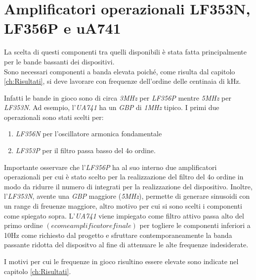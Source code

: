 \documentclass[titlepage]{report}
\begin{document}
	
\section{Amplificatori operazionali LF353N, LF356P e uA741}
\label{sec:OpAmp}
	La scelta di questi componenti tra quelli disponibili è stata fatta principalmente per le bande bassanti dei dispositivi.
	\\ Sono necessari componenti a banda elevata poiché, come risulta dal capitolo \ref{ch:Risultati}, si deve lavorare con frequenze dell'ordine delle centinaia di kHz.
	
	 \noindent Infatti le bande in gioco sono di circa \textit{3MHz} per \textit{LF356P} mentre \textit{5MHz} per \textit{LF353N}. Ad esempio, l'\textit{UA741} ha un \textit{GBP} di \textit{1MHz} tipico. I primi due operazionali sono stati scelti per:
	
	\begin{enumerate}
		\item \textit{LF356N} per l'oscillatore armonica fondamentale 
		\item \textit{LF353P} per il filtro passa basso del 4o ordine. 
	\end{enumerate}
	
	
	\noindent Importante osservare che l'\textit{LF356P} ha al suo interno due amplificatori operazionali per cui è stato scelto per la realizzazione del filtro del 4o ordine in modo da ridurre il numero di integrati per la realizzazione del dispositivo. Inoltre, l'\textit{LF353N}, avente una \textit{GBP} maggiore (\textit{5MHz}), permette di generare sinusoidi con un range di freuenze maggiore, altro motivo per cui si sono scelti i componenti come spiegato sopra.
	L'\textit{UA741} viene impiegato come filtro attivo passa alto del primo ordine $(e come amplificatore finale)$ per togliere le componenti inferiori a 10Hz come richiesto dal progetto e sfruttare contemporaneamente la banda passante ridotta del dispositvo al fine di attenuare le alte frequenze indesiderate.

	\noindent I motivi per cui le frequenze in gioco risultino essere elevate sono indicate nel capitolo \ref{ch:Risultati}.

	
\end{document}
